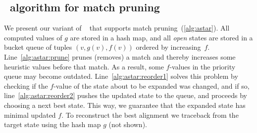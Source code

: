 \subsection{\A~algorithm for match pruning} \label{sec:astar-code}

We present our variant of \A~\citep{hart1968formal} that supports match
pruning~(\cref{alg:astar}). All computed values of $g$ are stored in a hash map,
and all \emph{open} states are stored in a bucket queue of tuples ${(v, g(v),
f(v))}$ ordered by increasing~$f$. Line~\ref{alg:astar:prune} prunes (removes) a
match and thereby increases some heuristic values before that match. As a
result, some \mbox{$f$-values} in the priority queue may become outdated.
Line~\ref{alg:astar:reorder1} solves this problem by checking if the
\mbox{$f$-value} of the state about to be expanded was changed, and if so,
line~\ref{alg:astar:reorder2} pushes the updated state to the queue, and
proceeds by choosing a next best state. This way, we guarantee that the expanded
state has minimal updated $f$. To reconstruct the best alignment we traceback
from the target state using the hash map $g$ (not shown).

\newcommand{\bolditem}{\refstepcounter{enumi}\item[\textbf{\theenumi.}]}
\newcommand{\boldsubitem}{\refstepcounter{enumii}\item[\textbf{\theenumii.}]}

\newif\ifboldnumber
\newcommand{\boldnext}{\global\boldnumbertrue}
\algrenewcommand\alglinenumber[1]{%
  \footnotesize\ifboldnumber\bfseries\fi\global\boldnumberfalse#1:}

